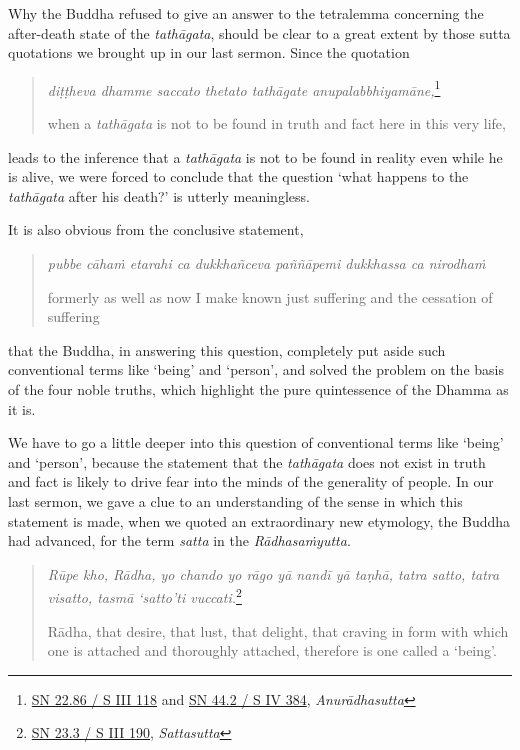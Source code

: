 Why the Buddha refused to give an answer to the tetralemma concerning the after-death state of the \emph{tathāgata}, should be clear to a great extent by those sutta quotations we brought up in our last sermon. Since the quotation

\begin{quote}
\emph{diṭṭheva dhamme saccato thetato tathāgate anupalabbhiyamāne,}\footnote{\href{https://suttacentral.net/sn22.86/pli/ms}{SN 22.86 / S III 118} and \href{https://suttacentral.net/sn44.2/pli/ms}{SN 44.2 / S IV 384}, \emph{Anurādhasutta}}

when a \emph{tathāgata} is not to be found in truth and fact here in this very life,
\end{quote}

leads to the inference that a \emph{tathāgata} is not to be found in reality even while he is alive, we were forced to conclude that the question `what happens to the \emph{tathāgata} after his death?' is utterly meaningless.

It is also obvious from the conclusive statement,

\begin{quote}
\emph{pubbe cāhaṁ etarahi ca dukkhañceva paññāpemi dukkhassa ca nirodhaṁ}

formerly as well as now I make known just suffering and the cessation of suffering
\end{quote}

that the Buddha, in answering this question, completely put aside such conventional terms like `being' and `person', and solved the problem on the basis of the four noble truths, which highlight the pure quintessence of the Dhamma as it is.

We have to go a little deeper into this question of conventional terms like `being' and `person', because the statement that the \emph{tathāgata} does not exist in truth and fact is likely to drive fear into the minds of the generality of people. In our last sermon, we gave a clue to an understanding of the sense in which this statement is made, when we quoted an extraordinary new etymology, the Buddha had advanced, for the term \emph{satta} in the \emph{Rādhasaṁyutta}.

\begin{quote}
\emph{Rūpe kho, Rādha, yo chando yo rāgo yā nandī yā taṇhā, tatra satto, tatra visatto, tasmā `satto'ti vuccati.}\footnote{\href{https://suttacentral.net/sn23.3/pli/ms}{SN 23.3 / S III 190}, \emph{Sattasutta}}

Rādha, that desire, that lust, that delight, that craving in form with which one is attached and thoroughly attached, therefore is one called a `being'.
\end{quote}

